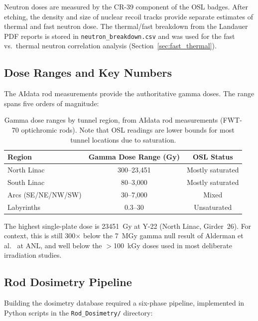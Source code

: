\documentclass[11pt,letterpaper]{article}
\begin{document}
\begin{description}[style=nextline]
    \item[Neutron Dosimetry (CR-39 Track Etch)]
    Neutron doses are measured by the CR-39 component of the OSL badges. After
    etching, the density and size of nuclear recoil tracks provide separate
    estimates of thermal and fast neutron dose. The thermal/fast breakdown from
    the Landauer PDF reports is stored in \texttt{neutron\_breakdown.csv} and
    was used for the fast vs.\ thermal neutron correlation analysis
    (Section~\ref{sec:fast_thermal}).
\end{description}

\subsection{Dose Ranges and Key Numbers}

The AIdata rod measurements provide the authoritative gamma doses. The range
spans five orders of magnitude:

\begin{table}[H]
\centering
\caption{Gamma dose ranges by tunnel region, from AIdata rod measurements
(FWT-70 optichromic rods). Note that OSL readings are lower bounds for most
tunnel locations due to saturation.}
\label{tab:dose_ranges}
\begin{tabular}{@{}lcc@{}}
\toprule
\textbf{Region} & \textbf{Gamma Dose Range (Gy)} & \textbf{OSL Status} \\
\midrule
North Linac    & 300--23,451 & Mostly saturated \\
South Linac    & 80--3,000   & Mostly saturated \\
Arcs (SE/NE/NW/SW) & 30--7,000 & Mixed \\
Labyrinths     & 0.3--30     & Unsaturated \\
\bottomrule
\end{tabular}
\end{table}

The highest single-plate dose is \SI{23451}{Gy} at Y-22 (North Linac,
Girder~26). For context, this is still 300$\times$ below the
\SI{7}{MGy} gamma null result of Alderman et al.~\cite{Alderman} at ANL, and well below the
$>$\SI{100}{kGy} doses used in most deliberate irradiation studies.

\subsection{Rod Dosimetry Pipeline}

Building the dosimetry database required a six-phase pipeline, implemented in
Python scripts in the \texttt{Rod\_Dosimetry/} directory:
\end{document}
